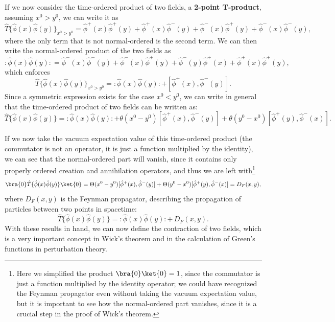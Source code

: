 If we now consider the time-ordered product of two fields, a \textbf{2-point T-product}, assuming \(x^0>y^0\), we can write it as
\[
    \hat{T} \{ \hat{\phi} (x) \hat{\phi} (y) \}_{x^0>y^0} = \hat{\phi}^{+}(x) \hat{\phi}^{+} (y) + \hat{\phi}^{+} (x) \hat{\phi}^{-} (y) + \hat{\phi}^{-} (x) \hat{\phi}^{+} (y) + \hat{\phi}^{-} (x) \hat{\phi}^{-} (y),
\]
where the only term that is not normal-ordered is the second term. We can then write the normal-ordered product of the two fields as
\[
    : \hat{\phi} (x) \hat{\phi} (y) : = \hat{\phi}^{-} (x) \hat{\phi}^{-} (y) + \hat{\phi}^{-} (x) \hat{\phi}^{+} (y) + \hat{\phi}^{-} (y) \hat{\phi}^{+} (x) + \hat{\phi}^{+} (x) \hat{\phi}^{+} (y),
\]
which enforces
\[
    \hat{T} \{ \hat{\phi} (x) \hat{\phi} (y) \}_{x^0>y^0} = : \hat{\phi} (x) \hat{\phi} (y) : + [\hat{\phi}^{+} (x), \hat{\phi}^{-} (y)].
\]
Since a symmetric expression exists for the case \(x^0<y^0\), we can write in general that the time-ordered product of two fields can be written as:
\[
    \hat{T} \{ \hat{\phi} (x) \hat{\phi} (y) \} = : \hat{\phi} (x) \hat{\phi} (y) : + \theta(x^0-y^0) [\hat{\phi}^{+} (x), \hat{\phi}^{-} (y)] + \theta(y^0-x^0) [\hat{\phi}^{+} (y), \hat{\phi}^{-} (x)].
\]

If we now take the vacuum expectation value of this time-ordered product (the commutator is not an operator, it is just a function multiplied by the identity), we can see that the normal-ordered part will vanish, since it contains only properly ordered creation and annihilation operators, and thus we are left with\footnote{Here we simplified the product \(\bra{0}\ket{0}=1\), since the commutator is just a function multiplied by the identity operator; we could have recognized the Feynman propagator even without taking the vacuum expectation value, but it is important to see how the normal-ordered part vanishes, since it is a crucial step in the proof of Wick's theorem.}
\[
    \bra{0} \hat{T} \{ \hat{\phi} (x) \hat{\phi} (y) \} \ket{0} = \Theta(x^0-y^0) [\hat{\phi}^{+} (x), \hat{\phi}^{-} (y)] + \Theta(y^0-x^0) [\hat{\phi}^{+} (y), \hat{\phi}^{-} (x)] = D_F (x,y),
\]
where \(D_F (x,y)\) is the Feynman propagator, describing the propagation of particles between two points in spacetime:
\[
    \hat{T} \{ \hat{\phi} (x) \hat{\phi} (y) \} = : \hat{\phi} (x) \hat{\phi} (y) : +\, D_F (x,y).
\]
With these results in hand, we can now define the contraction of two fields, which is a very important concept in Wick's theorem and in the calculation of Green's functions in perturbation theory.


